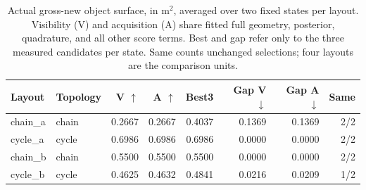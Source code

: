 \begin{table}[t]
\centering
\caption{Actual gross-new object surface, in m$^2$, averaged over two fixed states per layout. Visibility (V) and acquisition (A) share fitted full geometry, posterior, quadrature, and all other score terms. Best and gap refer only to the three measured candidates per state. Same counts unchanged selections; four layouts are the comparison units.}
\label{tab:paired-gain-selected}
\small
\begin{tabular}{llrrrrrr}
\toprule
Layout & Topology & V $\uparrow$ & A $\uparrow$ & Best3 & Gap V $\downarrow$ & Gap A $\downarrow$ & Same \\
\midrule
chain\_a & chain & 0.2667 & 0.2667 & 0.4037 & 0.1369 & 0.1369 & 2/2 \\
cycle\_a & cycle & 0.6986 & 0.6986 & 0.6986 & 0.0000 & 0.0000 & 2/2 \\
chain\_b & chain & 0.5500 & 0.5500 & 0.5500 & 0.0000 & 0.0000 & 2/2 \\
cycle\_b & cycle & 0.4625 & 0.4632 & 0.4841 & 0.0216 & 0.0209 & 1/2 \\
\bottomrule
\end{tabular}
\end{table}
